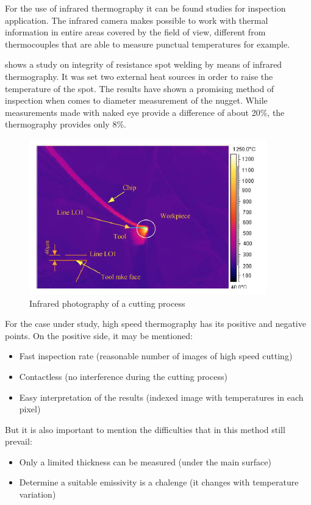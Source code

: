 	For the use of infrared thermography it can be found studies for inspection application. The infrared camera makes possible to work with thermal information in entire areas covered by the field of view, different from thermocouples that are able to measure punctual temperatures for example.

	 shows a study on integrity of resistance spot welding by means of infrared thermography. It was set two external heat sources in order to raise the temperature of the spot. The results have shown a promising method of inspection when comes to diameter measurement of the nugget. While measurements made with naked eye provide a difference of about 20\%, the thermography provides only 8\%.

	\begin{figure}[H]
		\centering
		\captionsetup{justification=centering}
		\includegraphics[scale=0.75]{Cap2/InfraRed/exinfrared.png}
		\caption{Infrared photography of a cutting process \cite{abukhshim2006heat}}
		\label{fig:exinfrared}
	\end{figure}

	For the case under study, high speed thermography has its positive and negative points. On the positive side, it may be mentioned:

	\begin{itemize}
		\item Fast inspection rate (reasonable number of images of high speed cutting)
		\item Contactless (no interference during the cutting process)
		\item Easy interpretation of the results (indexed image with temperatures in each pixel)
	\end{itemize}

	But it is also important to mention the difficulties that in this method still prevail:
	
	\begin{itemize}
		\item Only a limited thickness can be measured (under the main surface)
		\item Determine a suitable emissivity is a chalenge (it changes with temperature variation)
	\end{itemize}
